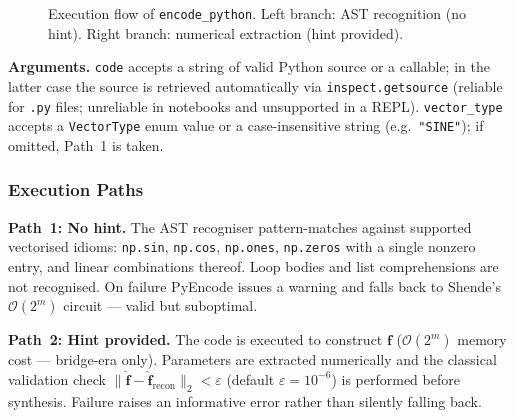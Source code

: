 \documentclass[10pt,twocolumn]{article}
\newcommand{\bigO}[1]{\mathcal{O}(#1)}
\begin{document}
\begin{figure}[ht]
\caption{Execution flow of \texttt{encode\_python}.
         Left branch: AST recognition (no hint).
         Right branch: numerical extraction (hint provided).}
\label{fig:encode_python_flow}
\end{figure}


\noindent\textbf{Arguments.}
\texttt{code} accepts a string of valid Python source or a
callable; in the latter case the source is retrieved
automatically via \texttt{inspect.getsource} (reliable for
\texttt{.py} files; unreliable in notebooks and unsupported
in a REPL). \texttt{vector\_type} accepts a \texttt{VectorType}
enum value or a case-insensitive string (e.g.\ \texttt{"SINE"});
if omitted, Path~1 is taken.

\subsubsection*{Execution Paths}

\textbf{Path~1: No hint.}
The AST recogniser pattern-matches against supported
vectorised idioms: \texttt{np.sin}, \texttt{np.cos},
\texttt{np.ones}, \texttt{np.zeros} with a single nonzero
entry, and linear combinations thereof. Loop bodies and
list comprehensions are not recognised. On failure PyEncode
issues a warning and falls back to Shende's $\bigO{2^m}$
circuit --- valid but suboptimal.

\textbf{Path~2: Hint provided.}
The code is executed to construct $\mathbf{f}$ ($\bigO{2^m}$
memory cost --- bridge-era only). Parameters are extracted
numerically and the classical validation check
$\|\hat{\mathbf{f}}-\hat{\mathbf{f}}_{\mathrm{recon}}\|_2 <
\varepsilon$ (default $\varepsilon=10^{-6}$) is performed
before synthesis. Failure raises an informative error rather
than silently falling back.
\end{document}
